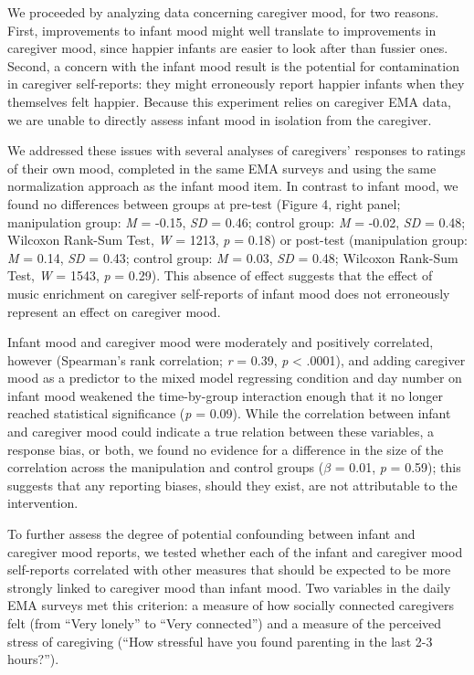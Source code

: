\documentclass[
]{article}
\begin{document}
We proceeded by analyzing data concerning caregiver mood, for two
reasons. First, improvements to infant mood might well translate to
improvements in caregiver mood, since happier infants are easier to look
after than fussier ones. Second, a concern with the infant mood result
is the potential for contamination in caregiver self-reports: they might
erroneously report happier infants when they themselves felt happier.
Because this experiment relies on caregiver EMA data, we are unable to
directly assess infant mood in isolation from the caregiver.

We addressed these issues with several analyses of caregivers' responses
to ratings of their own mood, completed in the same EMA surveys and
using the same normalization approach as the infant mood item. In
contrast to infant mood, we found no differences between groups at
pre-test (Figure 4, right panel; manipulation group: \emph{M} = -0.15,
\emph{SD} = 0.46; control group: \emph{M} = -0.02, \emph{SD} = 0.48;
Wilcoxon Rank-Sum Test, \emph{W} = 1213, \emph{p} = 0.18) or post-test
(manipulation group: \emph{M} = 0.14, \emph{SD} = 0.43; control group:
\emph{M} = 0.03, \emph{SD} = 0.48; Wilcoxon Rank-Sum Test, \emph{W} =
1543, \emph{p} = 0.29). This absence of effect suggests that the effect
of music enrichment on caregiver self-reports of infant mood does not
erroneously represent an effect on caregiver mood.

Infant mood and caregiver mood were moderately and positively
correlated, however (Spearman's rank correlation; \emph{r} = 0.39,
\emph{p} \textless{} .0001), and adding caregiver mood as a predictor to
the mixed model regressing condition and day number on infant mood
weakened the time-by-group interaction enough that it no longer reached
statistical significance (\emph{p} = 0.09). While the correlation
between infant and caregiver mood could indicate a true relation between
these variables, a response bias, or both, we found no evidence for a
difference in the size of the correlation across the manipulation and
control groups (\(\beta\) = 0.01, \emph{p} = 0.59); this suggests that
any reporting biases, should they exist, are not attributable to the
intervention.

To further assess the degree of potential confounding between infant and
caregiver mood reports, we tested whether each of the infant and
caregiver mood self-reports correlated with other measures that should
be expected to be more strongly linked to caregiver mood than infant
mood. Two variables in the daily EMA surveys met this criterion: a
measure of how socially connected caregivers felt (from ``Very lonely''
to ``Very connected'') and a measure of the perceived stress of
caregiving (``How stressful have you found parenting in the last 2-3
hours?'').
\end{document}
